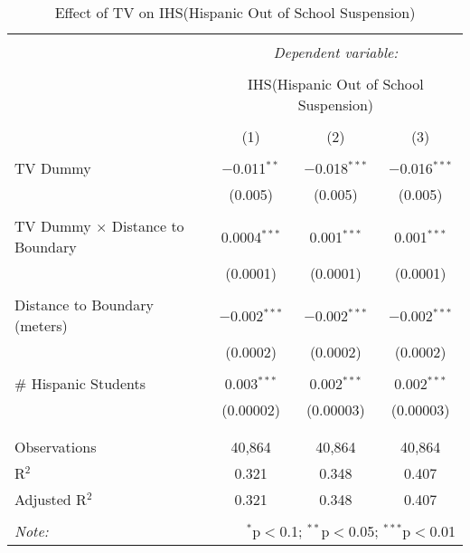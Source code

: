 
\begin{table}[!htbp] \centering 
  \caption{Effect of TV on IHS(Hispanic Out of School Suspension)} 
  \label{} 
\begin{tabular}{@{\extracolsep{-2pt}}lccc} 
\\[-1.8ex]\hline 
\hline \\[-1.8ex] 
 & \multicolumn{3}{c}{\textit{Dependent variable:}} \\ 
\cline{2-4} 
\\[-1.8ex] & \multicolumn{3}{c}{IHS(Hispanic Out of School Suspension)} \\ 
\\[-1.8ex] & (1) & (2) & (3)\\ 
\hline \\[-1.8ex] 
 TV Dummy & $-$0.011$^{**}$ & $-$0.018$^{***}$ & $-$0.016$^{***}$ \\ 
  & (0.005) & (0.005) & (0.005) \\ 
  & & & \\ 
 TV Dummy $\times$ Distance to Boundary & 0.0004$^{***}$ & 0.001$^{***}$ & 0.001$^{***}$ \\ 
  & (0.0001) & (0.0001) & (0.0001) \\ 
  & & & \\ 
 Distance to Boundary (meters) & $-$0.002$^{***}$ & $-$0.002$^{***}$ & $-$0.002$^{***}$ \\ 
  & (0.0002) & (0.0002) & (0.0002) \\ 
  & & & \\ 
 \# Hispanic Students & 0.003$^{***}$ & 0.002$^{***}$ & 0.002$^{***}$ \\ 
  & (0.00002) & (0.00003) & (0.00003) \\ 
  & & & \\ 
\hline \\[-1.8ex] 
Observations & 40,864 & 40,864 & 40,864 \\ 
R$^{2}$ & 0.321 & 0.348 & 0.407 \\ 
Adjusted R$^{2}$ & 0.321 & 0.348 & 0.407 \\ 
\hline 
\hline \\[-1.8ex] 
\textit{Note:}  & \multicolumn{3}{r}{$^{*}$p$<$0.1; $^{**}$p$<$0.05; $^{***}$p$<$0.01} \\ 
\end{tabular} 
\end{table} 
